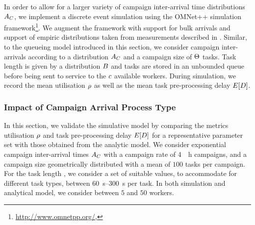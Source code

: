 In order to allow for a larger variety of campaign inter-arrival time distributions \(A_C\), we implement a discrete event simulation using the OMNet++ simulation framework\footnote{\url{http://www.omnetpp.org/}, \accessed}.
We augment the framework with support for bulk arrivals and support of empiric distributions taken from measurements described in .
Similar, to the queueing model introduced in this section, we consider campaign inter-arrivals according to a distribution \(A_C\) and a campaign size of \(\Theta\) tasks.
Task length is given by a distribution \(B\) and tasks are stored in an unbounded queue before being sent to service to the \(c\) available workers.
During simulation, we record the mean utilisation \(\rho\) as well as the mean task pre-processing delay \(E[D]\).

\subsubsection*{Impact of Campaign Arrival Process Type}

In this section, we validate the simulative model by comparing the metrics utilisation \(\rho\) and task pre-processing delay \(E[D]\) for a representative parameter set with those obtained from the analytic model.
We consider exponential campaign inter-arrival times \(A_C\) with a campaign rate of \SI{4}{\per\hour} campaigns, and a campaign size \campaignSize geometrically distributed with a mean of \(100\) tasks per campaign.
For the task length \taskDuration, we consider a set of suitable values, to accommodate for different task types, between \SIrange{60}{300}{\second} per task.
In both simulation and analytical model, we consider between \(5\) and \(50\) workers.

